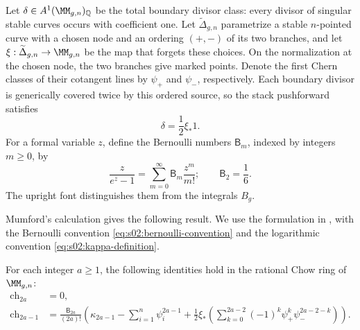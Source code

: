 Let $\delta\in A^1(\MM_{g,n})_{\mathbb Q}$ be the total boundary
divisor class: every divisor of singular stable curves occurs with
coefficient one.  Let $\widetilde\Delta_{g,n}$ parametrize a stable
$n$-pointed curve with a chosen node and an ordering $(+,-)$ of its two
branches, and let $\xi:\widetilde\Delta_{g,n}\to\MM_{g,n}$ be the
map that forgets these choices.  On the normalization at the chosen
node, the two branches give marked points.  Denote the first Chern
classes of their cotangent lines by $\psi_+$ and $\psi_-$,
respectively.  Each boundary divisor is generically covered twice by this ordered
source, so the stack pushforward satisfies
\begin{equation}
\label{eq:s02:ordered-boundary}
\delta=\frac12\xi_*1.
\end{equation}
For a formal variable $z$, define the Bernoulli numbers
$\mathsf B_m$, indexed by integers $m\geq0$, by
\begin{equation}
\label{eq:s02:bernoulli-convention}
\frac{z}{e^z-1}=\sum_{m=0}^{\infty}\mathsf B_m\frac{z^m}{m!};
\qquad \mathsf B_2=\frac16.
\end{equation}
The upright font distinguishes them from the integrals $B_g$.

Mumford's calculation \cite[\S 5, (5.2)--(5.3)]{Mum83} gives the
following result.  We use the formulation in
\cite[\S 1.1, Theorem (Mumford)]{FP00}, with the Bernoulli convention
\eqref{eq:s02:bernoulli-convention} and the logarithmic convention
\eqref{eq:s02:kappa-definition}.

\begin{thm}
\label{thm:s02:grr}
For each integer $a\geq1$, the following identities hold in the
rational Chow ring of $\MM_{g,n}$:
\begin{equation}
\label{eq:s02:grr}
\begin{split}
\mathrm{ch}_{2a}&=0,\\
\mathrm{ch}_{2a-1}
&=\frac{\mathsf B_{2a}}{(2a)!}
\left(
\kappa_{2a-1}-\sum_{i=1}^n\psi_i^{2a-1}
+\frac12\xi_*\!\left(
\sum_{k=0}^{2a-2}(-1)^k\psi_+^k\psi_-^{2a-2-k}
\right)\right).
\end{split}
\end{equation}
\end{thm}

